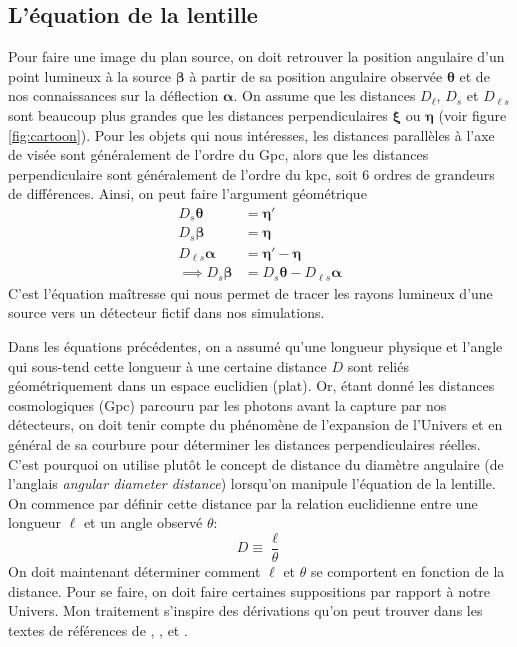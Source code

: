 \subsection{L'équation de la lentille}

Pour faire une image du plan source, on doit retrouver la position angulaire 
d'un point lumineux à la source $\boldsymbol{ \beta}$ à partir de sa position angulaire
observée $\boldsymbol{ \theta} $ et de nos connaissances sur la déflection $\boldsymbol{ \alpha}$. 
On assume que les distances $D_{\ell}$, $D_s$ et $D_{\ell s}$ sont beaucoup 
plus grandes que les distances perpendiculaires $\boldsymbol{ \xi} $ ou $\boldsymbol{ \eta} $ 
(voir figure \ref{fig:cartoon}). 
Pour les objets qui nous intéresses, les distances parallèles à l'axe de visée sont généralement 
de l'ordre du Gpc, alors que les distances perpendiculaire sont généralement 
de l'ordre du kpc, soit 6 ordres de grandeurs de différences.
Ainsi, on peut faire l'argument géométrique
\begin{equation}\label{eq:lens equation}
       \begin{aligned}
               D_{s} \boldsymbol{ \theta} &= \boldsymbol{ \eta}' \\   
               D_{s} \boldsymbol{ \beta} &= \boldsymbol{ \eta} \\   
               D_{\ell s} \boldsymbol{ \alpha} &= \boldsymbol{ \eta}' - \boldsymbol{ \eta}  \\   
               \implies D_s \boldsymbol{ \beta} &= D_s \boldsymbol{ \theta} - D_{\ell s} \boldsymbol{ \alpha}   
       \end{aligned} 
\end{equation} 
C'est l'équation maîtresse qui nous permet de tracer les rayons lumineux d'une source 
vers un détecteur fictif dans nos simulations.

Dans les équations précédentes, on a assumé qu'une 
longueur physique et l'angle qui sous-tend cette longueur à une certaine distance 
$D$ sont reliés géométriquement dans un espace euclidien (plat). Or, étant donné 
les distances cosmologiques (Gpc) parcouru par les photons avant la capture par nos détecteurs, 
on doit tenir compte du phénomène de l'expansion de l'Univers et en général de sa courbure 
pour déterminer les distances perpendiculaires réelles. C'est pourquoi on utilise plutôt 
le concept de distance du diamètre angulaire (de l'anglais \textit{angular diameter distance}) 
lorsqu'on manipule l'équation de la lentille. On commence par définir cette distance par 
la relation euclidienne entre une longueur $\ell$ et un angle observé $\theta$:
\begin{equation}\label{eq:D}
        D \equiv \frac{\ell}{\theta}
\end{equation} 
On doit maintenant déterminer comment $\ell$ et $\theta$ se comportent en fonction de 
la distance. Pour se faire, on doit faire certaines suppositions par rapport 
à notre Univers. Mon traitement s'inspire des dérivations qu'on peut trouver 
dans les textes de références de \citet{Dodelson2003}, \citet{Carroll2003}, \citet{Rindler2006} et 
\citet{Weinberg2008}.

